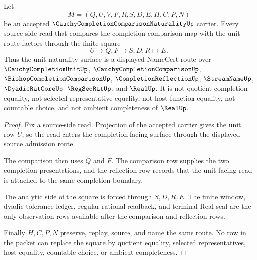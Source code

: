\begin{theorem}
\label{thm:cauchy-completion-comparison-naturality-unit-square}
Let
$$
M=(Q,U,V,F,R,S,D,E,H,C,P,N)
$$
be an accepted $\CauchyCompletionComparisonNaturalityUp$ carrier. Every source-side read that compares the completion comparison map with the unit route factors through the finite square
$$
U \longmapsto Q,F \longmapsto S,D,R \longmapsto E .
$$
Thus the unit naturality surface is a displayed NameCert route over $\CauchyCompletionUnitUp$, $\CauchyCompletionComparisonUp$, $\BishopCompletionComparisonUp$, $\CompletionReflectionUp$, $\StreamNameUp$, $\DyadicRatCoreUp$, $\RegSeqRatUp$, and $\RealUp$. It is not quotient completion equality, not selected representative equality, not host function equality, not countable choice, and not ambient completeness of $\RealUp$.
\end{theorem}
\begin{proof}
Fix a source-side read. Projection of the accepted carrier gives the unit row $U$, so the read enters the completion-facing surface through the displayed source admission route.

The comparison then uses $Q$ and $F$. The comparison row supplies the two completion presentations, and the reflection row records that the unit-facing read is attached to the same completion boundary.

The analytic side of the square is forced through $S,D,R,E$. The finite window, dyadic tolerance ledger, regular rational readback, and terminal Real seal are the only observation rows available after the comparison and reflection rows.

Finally $H,C,P,N$ preserve, replay, source, and name the same route. No row in the packet can replace the square by quotient equality, selected representatives, host equality, countable choice, or ambient completeness.
\end{proof}

